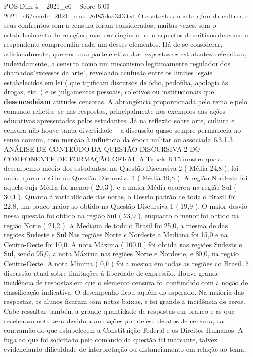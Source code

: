 \begin{textsample}{POS Dim 4 – 2021\_c6 – Score 6.00 – 2021\_c6/enade\_2021\_mus\_8d85dac343.txt}
O contexto da arte e/ou da cultura e seus confrontos com a censura foram considerados, muitas vezes, sem o estabelecimento de relações, mas restringindo -se a aspectos descritivos de como o respondente compreendia cada um desses elementos.
Há de se considerar, adicionalmente, que em uma parte efetiva das respostas os estudantes defendiam, indevidamente, a censura como um mecanismo legitimamente regulador dos chamados"excessos da arte", revelando confusão entre os limites legais estabelecidos em lei ( que tipificam discursos de ódio, pedofilia, apologia às drogas, etc. ) e os julgamentos pessoais, coletivos ou institucionais que \textbf{desencadeiam} atitudes censoras.
A abrangência proporcionada pelo tema e pelo comando refletiu -se nas respostas, principalmente nos exemplos das ações educativas apresentados pelos estudantes.
Já na reflexão sobre arte, cultura e censura não houve tanta diversidade – a discussão quase sempre permanecia no senso comum, com menção à influência da época militar ou associada 6.3.1.3 ANÁLISE DE CONTEÚDO DA QUESTÃO DISCURSIVA 2 DO COMPONENTE DE FORMAÇÃO GERAL A Tabela 6.15 mostra que o desempenho médio dos estudantes, na Questão Discursiva 2 ( Média 24,8 ), foi maior que o obtido na Questão Discursiva 1 ( Média 19,8 ).
A região Nordeste foi aquela cuja Média foi menor ( 20,3 ), e a maior Média ocorreu na região Sul ( 30,1 ).
Quanto à variabilidade das notas, o Desvio padrão de todo o Brasil foi 22,8, um pouco maior ao obtido na Questão Discursiva 1 ( 19,9 ).
O maior desvio nessa questão foi obtido na região Sul ( 23,9 ), enquanto o menor foi obtido na região Norte ( 21,2 ).
A Mediana de todo o Brasil foi 25,0, a mesma de das regiões Sudeste e Sul Nas regiões Norte e Nordeste a Mediana foi 15,0 e na Centro-Oeste foi 10,0.
A nota Máxima ( 100,0 ) foi obtida nas regiões Sudeste e Sul, sendo 95,0, a nota Máxima nas regiões Norte e Nordeste, e 80,0, na região Centro-Oeste.
A nota Mínima ( 0,0 ) foi a mesma em todas as regiões do Brasil. à discussão atual sobre limitações à liberdade de expressão.
Houve grande incidência de respostas em que o elemento censura foi confundido com a noção de classificação indicativa.
O desempenho ficou aquém do esperado.
Na maioria das respostas, os alunos ficaram com notas baixas, e foi grande a incidência de zeros.
Cabe ressaltar também a grande quantidade de respostas em branco e as que receberam nota zero devido a anulações por defesa de atos de censura, na contramão do que estabelecem a Constituição Federal e os Direitos Humanos.
A fuga ao que foi solicitado pelo comando da questão foi marcante, talvez evidenciando dificuldade de interpretação ou distanciamento em relação ao tema.

\end{textsample}
